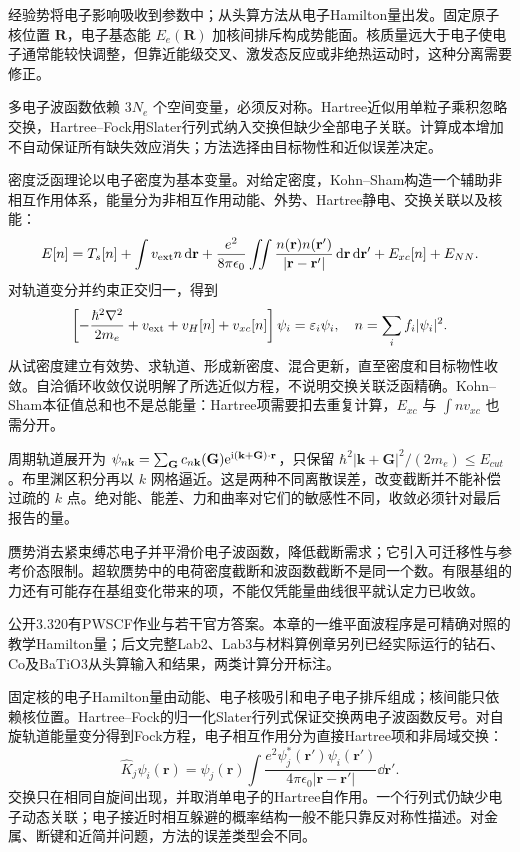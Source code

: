 经验势将电子影响吸收到参数中；从头算方法从电子Hamilton量出发。固定原子核位置 $\mathbf R$，电子基态能 $E_e(\mathbf R)$ 加核间排斥构成势能面。核质量远大于电子使电子通常能较快调整，但靠近能级交叉、激发态反应或非绝热运动时，这种分离需要修正。

多电子波函数依赖 $3N_e$ 个空间变量，必须反对称。Hartree近似用单粒子乘积忽略交换，Hartree--Fock用Slater行列式纳入交换但缺少全部电子关联。计算成本增加不自动保证所有缺失效应消失；方法选择由目标物性和近似误差决定。

密度泛函理论以电子密度为基本变量。对给定密度，Kohn--Sham构造一个辅助非相互作用体系，能量分为非相互作用动能、外势、Hartree静电、交换关联以及核能：
\[
E[n]=T_s[n]+\int v_{\rm ext}n\,\mathrm d\mathbf r+\frac{e^2}{8\pi\epsilon_0}\iint\frac{n(\mathbf r)n(\mathbf r')}{|\mathbf r-\mathbf r'|}\,\mathrm d\mathbf r\,\mathrm d\mathbf r'+E_{xc}[n]+E_{NN}.
\]
对轨道变分并约束正交归一，得到
\[
\left[-\frac{\hbar^2\nabla^2}{2m_e}+v_{\rm ext}+v_H[n]+v_{xc}[n]\right]\psi_i=\varepsilon_i\psi_i,\quad n=\sum_i f_i|\psi_i|^2.
\]
从试密度建立有效势、求轨道、形成新密度、混合更新，直至密度和目标物性收敛。自洽循环收敛仅说明解了所选近似方程，不说明交换关联泛函精确。Kohn--Sham本征值总和也不是总能量：Hartree项需要扣去重复计算，$E_{xc}$ 与 $\int nv_{xc}$ 也需分开。

周期轨道展开为 $\psi_{n\mathbf k}=\sum_\mathbf G c_{n\mathbf k}(\mathbf G)\mathrm e^{\mathrm i(\mathbf k+\mathbf G)\cdot\mathbf r}$，只保留 $\hbar^2|\mathbf k+\mathbf G|^2/(2m_e)\le E_{cut}$。布里渊区积分再以 $k$ 网格逼近。这是两种不同离散误差，改变截断并不能补偿过疏的 $k$ 点。绝对能、能差、力和曲率对它们的敏感性不同，收敛必须针对最后报告的量。

赝势消去紧束缚芯电子并平滑价电子波函数，降低截断需求；它引入可迁移性与参考价态限制。超软赝势中的电荷密度截断和波函数截断不是同一个数。有限基组的力还有可能存在基组变化带来的项，不能仅凭能量曲线很平就认定力已收敛。

公开3.320有PWSCF作业与若干官方答案。本章的一维平面波程序是可精确对照的教学Hamilton量；后文完整Lab2、Lab3与材料算例章另列已经实际运行的钻石、Co及BaTiO3从头算输入和结果，两类计算分开标注。

固定核的电子Hamilton量由动能、电子核吸引和电子电子排斥组成；核间能只依赖核位置。Hartree--Fock的归一化Slater行列式保证交换两电子波函数反号。对自旋轨道能量变分得到Fock方程，电子相互作用分为直接Hartree项和非局域交换：
\[
\hat K_j\psi_i(\mathbf r)=\psi_j(\mathbf r)\int
\frac{e^2\psi_j^*(\mathbf r')\psi_i(\mathbf r')}{4\pi\epsilon_0|\mathbf r-\mathbf r'|}\dd\mathbf r'.
\]
交换只在相同自旋间出现，并取消单电子的Hartree自作用。一个行列式仍缺少电子动态关联；电子接近时相互躲避的概率结构一般不能只靠反对称性描述。对金属、断键和近简并问题，方法的误差类型会不同。

